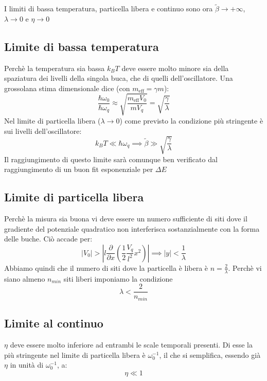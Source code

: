 \documentclass[italian]{article}
\newcommand{\meff}{m_{\mathrm{eff}}}
\newcommand{\deriv}[2]{\frac{\partial #1}{\partial #2}}
\begin{document}
    I limiti di bassa temperatura, particella libera e continuo sono ora $\tilde{\beta} \to +\infty$, $\lambda \to 0$ e $\eta \to 0$
    \subsection{Limite di bassa temperatura}
    Perchè la temperatura sia bassa $k_B T$ deve essere molto minore sia della spaziatura dei livelli della singola buca, che di quelli dell'oscillatore.
    Una grossolana stima dimensionale dice (con $\meff = \gamma m$):
    $$
        \frac{\hbar\omega_0}{\hbar\omega_q} \approx \sqrt{\frac{\meff V_0}{m V_q}} = \sqrt{\frac{\gamma}{\lambda}}
    $$
    Nel limite di particella libera ($\lambda\to0$) come previsto la condizione più stringente è sui livelli dell'oscillatore:
    \begin{equation}
        k_B T \ll \hbar \omega_q \implies \tilde{\beta} \gg \sqrt{\frac{\gamma }{\lambda}}
    \end{equation}
    Il raggiungimento di questo limite sarà comunque ben verificato dal raggiungimento di un buon fit esponenziale per $\Delta E$
    
    \subsection{Limite di particella libera}
    
    Perchè la misura sia buona vi deve essere un numero sufficiente di siti dove il gradiente del potenziale quadratico non interferisca sostanzialmente con la forma delle buche. Ciò accade per:
    $$
        \left|V_0\right| > \left|l\deriv{}{x}\left(\frac{1}{2}\frac{V_q}{l^2}x^2\right)\right|
        \implies \left|y\right| < \frac{1}{\lambda}
    $$
    Abbiamo quindi che il numero di siti dove la particella è libera è $n = \frac{2}{\lambda}$. Perchè vi siano almeno $n_{min}$ siti liberi imponiamo la condizione
    \begin{equation}
        \lambda < \frac{2}{n_{min}}
    \end{equation}
    
    \subsection{Limite al continuo}
    
    $\eta$ deve essere molto inferiore ad entrambi le scale temporali presenti. Di esse la più stringente nel limite di particella libera è $\omega_0^{-1}$, il che si semplifica, essendo già $\eta$ in unità di $\omega_0^{-1}$, a:
    \begin{equation}
        \eta \ll 1
    \end{equation}
    
\end{document}
